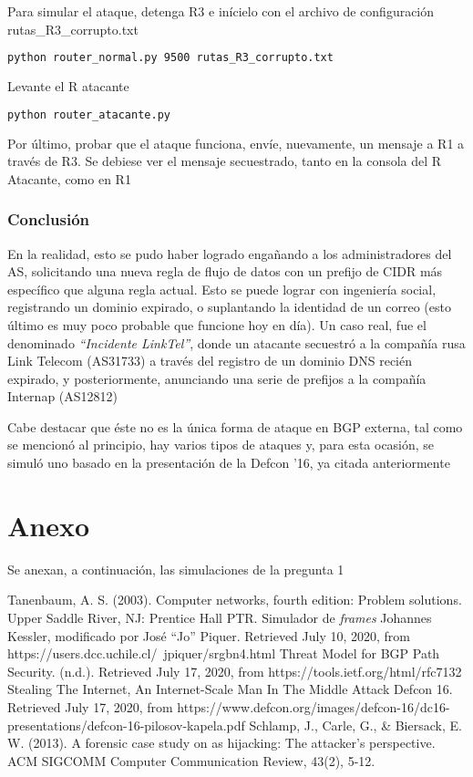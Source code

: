 \documentclass{article}
\begin{document}
Para simular el ataque, detenga R3 e inícielo con el archivo de configuración rutas\_R3\_corrupto.txt
\begin{lstlisting}[language=bash, caption=Ejemplo de transmisión de mensaje a R1 a través de R3]
python router_normal.py 9500 rutas_R3_corrupto.txt
\end{lstlisting}

Levante el R atacante
\begin{lstlisting}[language=bash, caption=Se levanta el router atacante de R1]
python router_atacante.py
\end{lstlisting}

Por último, probar que el ataque funciona, envíe, nuevamente, un mensaje a R1 a través de R3. Se debiese ver el mensaje secuestrado, tanto en la consola del R Atacante, como en R1

\subsubsection{Conclusión}
En la realidad, esto se pudo haber logrado engañando a los administradores del AS, solicitando una nueva regla de flujo de datos con un prefijo de CIDR más específico que alguna regla actual. Esto se puede lograr con ingeniería social, registrando un dominio expirado, o suplantando la identidad de un correo (esto último es muy poco probable que funcione hoy en día). Un caso real, fue el  denominado \textit{``Incidente LinkTel''}, donde un atacante secuestró a la compañía rusa Link Telecom (AS31733) a través del registro de un dominio DNS recién expirado, y posteriormente, anunciando una serie de prefijos a la compañía Internap (AS12812)\cite{forensic}

Cabe destacar que éste no es la única forma de ataque en BGP externa, tal como se mencionó al principio, hay varios tipos de ataques y, para esta ocasión, se simuló uno basado en la presentación de la Defcon '16, ya citada anteriormente

\section{Anexo}

Se anexan, a continuación, las simulaciones de la pregunta 1

\begin{thebibliography}{9}
 Tanenbaum, A. S. (2003). Computer networks, fourth edition: Problem solutions. Upper Saddle River, NJ: Prentice Hall PTR.
Simulador de \textit{frames} Johannes Kessler, modificado por José ``Jo'' Piquer. Retrieved July 10, 2020, from https://users.dcc.uchile.cl/~jpiquer/srgbn4.html
 Threat Model for BGP Path Security. (n.d.). Retrieved July 17, 2020, from https://tools.ietf.org/html/rfc7132
 Stealing The Internet, An Internet-Scale Man In The Middle Attack Defcon 16. Retrieved July 17, 2020, from https://www.defcon.org/images/defcon-16/dc16-presentations/defcon-16-pilosov-kapela.pdf
Schlamp, J., Carle, G., \& Biersack, E. W. (2013). A forensic case study on as hijacking: The attacker's perspective. ACM SIGCOMM Computer Communication Review, 43(2), 5-12.
\end{thebibliography}
\end{document}
